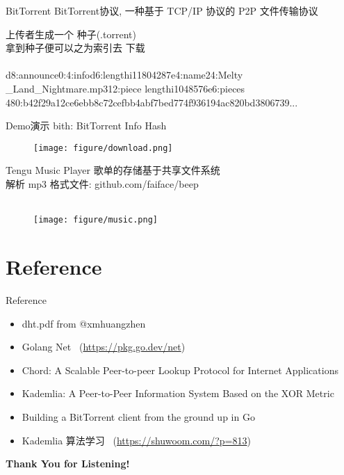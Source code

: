\documentclass[10pt]{beamer}
\begin{document}
\begin{frame}{BitTorrent}
\alert{BitTorrent协议}, 一种基于 \alert{TCP/IP} 协议的 P2P 文件传输协议

上传者生成一个 \alert{种子(.torrent)} \\
拿到种子便可以之为索引去 \alert{下载} \\

\\[20pt]

d8:announce0:4:infod6:lengthi11804287e4:name24:Melty \\
\_Land\_Nightmare.mp312:piece lengthi1048576e6:pieces \\
480:b42f29a12ce6ebb8c72cefbb4abf7bed774f936194ac820bd3806739...

\end{frame}

\begin{frame}{Demo演示}
\alert{bith:} BitTorrent Info Hash
\begin{figure}
\centering
\texttt{[image: figure/download.png]}
\end{figure}
\end{frame}

\begin{frame}{Tengu Music Player}
歌单的存储基于共享文件系统 \\

解析 mp3 格式文件: github.com/faiface/beep \\
\\[20pt]
\begin{figure}
\centering
\texttt{[image: figure/music.png]}
\end{figure}

\end{frame}

\section{Reference}

\begin{frame}{Reference}

\begin{itemize}
\item
\alert{dht.pdf} from @xmhuangzhen

\item
\alert{Golang Net} \ (\url{https://pkg.go.dev/net})

\item
\alert{Chord: A Scalable Peer-to-peer Lookup Protocol for Internet Applications}

\item
\alert{Kademlia: A Peer-to-Peer Information System Based on the XOR Metric}

\item
\alert{Building a BitTorrent client from the ground up in Go}

\item
\alert{Kademlia 算法学习} \ (\url{https://shuwoom.com/?p=813})

\end{itemize}

\end{frame}

\begin{frame}[standout]
  \centering
  \textbf{Thank You for Listening!}
\end{frame}
\end{document}

